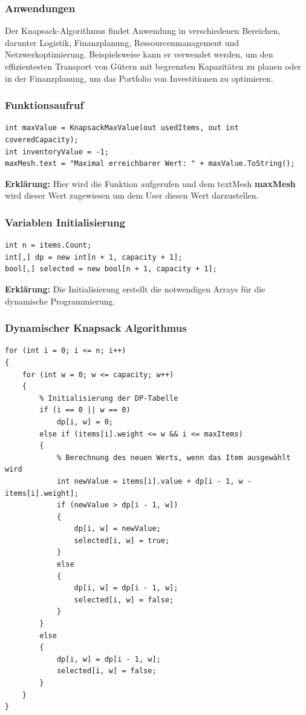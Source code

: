\subsubsection{Anwendungen}
Der Knapsack-Algorithmus findet Anwendung in verschiedenen Bereichen, darunter Logistik, Finanzplanung,
Ressourcenmanagement und Netzwerkoptimierung. Beispielsweise kann er verwendet werden, um den effizientesten
Transport von Gütern mit begrenzten Kapazitäten zu planen oder in der Finanzplanung, um das Portfolio von
Investitionen zu optimieren.

\subsubsection{Funktionsaufruf}
\begin{lstlisting}[style=csharp, caption={}, label=code:init]
int maxValue = KnapsackMaxValue(out usedItems, out int coveredCapacity);
int inventoryValue = -1;
maxMesh.text = "Maximal erreichbarer Wert: " + maxValue.ToString();
\end{lstlisting}
\textbf{Erklärung:} Hier wird die Funktion aufgerufen und dem textMesh \textbf{maxMesh} wird dieser Wert zugewiesen um dem User diesen Wert darzustellen.\\

\subsubsection{Variablen Initialisierung}
\begin{lstlisting}[style=csharp, caption={}, label=code:variable]
int n = items.Count;
int[,] dp = new int[n + 1, capacity + 1];
bool[,] selected = new bool[n + 1, capacity + 1];
\end{lstlisting}
\textbf{Erklärung:} Die Initialisierung erstellt die notwendigen Arrays für die dynamische Programmierung.\\

\subsubsection{Dynamischer Knapsack Algorithmus}
\begin{lstlisting}[style=csharp, caption={}, label=code:dynamic]
for (int i = 0; i <= n; i++)
{
    for (int w = 0; w <= capacity; w++)
    {
        % Initialisierung der DP-Tabelle
        if (i == 0 || w == 0)
            dp[i, w] = 0;
        else if (items[i].weight <= w && i <= maxItems)
        {
            % Berechnung des neuen Werts, wenn das Item ausgewählt wird
            int newValue = items[i].value + dp[i - 1, w - items[i].weight];
            if (newValue > dp[i - 1, w])
            {
                dp[i, w] = newValue;
                selected[i, w] = true;
            }
            else
            {
                dp[i, w] = dp[i - 1, w];
                selected[i, w] = false;
            }
        }
        else
        {
            dp[i, w] = dp[i - 1, w];
            selected[i, w] = false;
        }
    }
}
\end{lstlisting}

